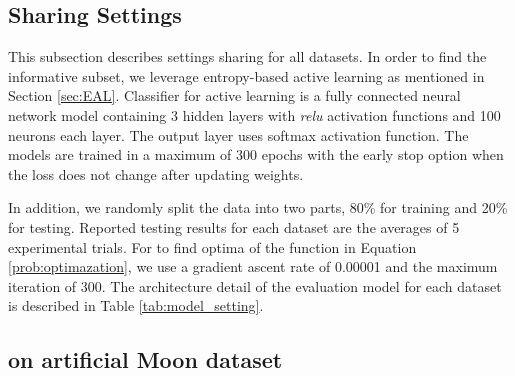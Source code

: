 \subsection{Sharing Settings}
This subsection describes settings sharing for all datasets. In order to find the informative subset, we leverage entropy-based active learning as mentioned in Section \ref{sec:EAL}. Classifier for active learning is a fully connected neural network model containing 3 hidden layers with \textit{relu} activation functions and 100 neurons each layer. The output layer uses softmax activation function. The models are trained in a maximum of 300 epochs with the early stop option when the loss does not change after updating weights. 

In addition, we randomly split the data into two parts, 80\% for training and 20\% for testing. Reported testing results for each dataset are the averages of 5 experimental trials. For \Methodname{} to find optima of the function in Equation \ref{prob:optimazation}, we use a gradient ascent rate of 0.00001 and the maximum iteration of 300. The architecture detail of the evaluation model for each dataset is described in Table \ref{tab:model_setting}.



\subsection{\Methodname{} on artificial Moon dataset}

